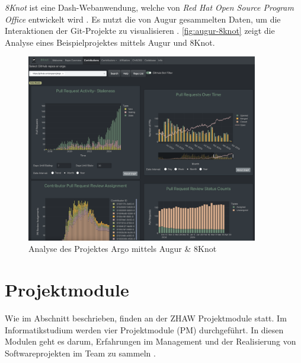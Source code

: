 \textit{8Knot} ist eine Dash-Webanwendung, welche von \textit{Red Hat Open Source Program Office} entwickelt wird \parencite{noauthor_measuring_nodate}. Es nutzt die von Augur gesammelten Daten, um die Interaktionen der Git-Projekte zu visualisieren \parencite{noauthor_chaossaugur_nodate} \parencite{noauthor_oss-aspen8knot_2025}. \autoref{fig:augur-8knot} zeigt die Analyse eines Beispielprojektes mittels Augur und 8Knot. 
\begin{figure}[htbp]
    \centering
    \includegraphics[width=0.9\textwidth]{Figures/augur-8knot.png}
    \caption{Analyse des Projektes Argo mittels Augur \& 8Knot \parencite{noauthor_metrixchaossio_nodate} \parencite{noauthor_argoprojargo-workflows_2025}}
    \label{fig:augur-8knot}
\end{figure}




\section{Projektmodule}
\label{sec:Projektmodule} 
Wie im Abschnitt  beschrieben, finden an der ZHAW Projektmodule statt. Im  Informatikstudium werden vier Projektmodule (PM) durchgeführt. In diesen Modulen geht es darum, Erfahrungen im Management und der Realisierung von Softwareprojekten im Team zu sammeln \parencite{noauthor_modul_nodate}. 

